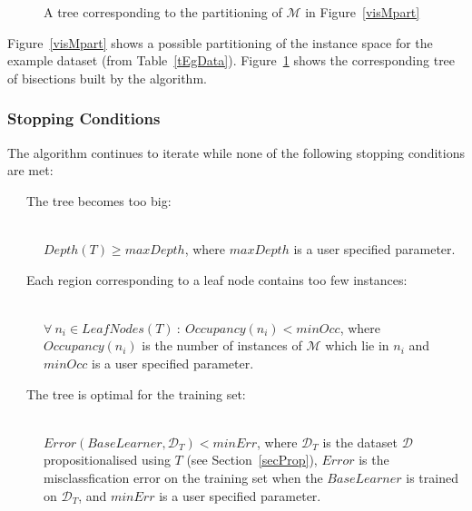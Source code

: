 \documentclass[a4paper,12pt]{article} %
\newcommand{\mcl}[1]{\mathcal{#1}}
\begin{document}
\begin{figure}
\begin{center}
\end{center}
\caption{A tree corresponding to the partitioning of $\mcl{M}$ in Figure~\ref{visMpart}}
\label{visMTree}
\end{figure}
    
Figure~\ref{visMpart} shows a possible partitioning of 
    the instance space for the example dataset (from Table~\ref{tEgData}).
Figure~\ref{visMTree} shows the corresponding tree of bisections built by
    the algorithm.

\subsubsection{Stopping Conditions}
\label{secStopCond}

The algorithm continues to iterate while none of the following stopping conditions are met:
\begin{description}

\item[~~~The tree becomes too big:] \ \\
    $Depth(T) \geq maxDepth$, 
    where  $maxDepth$ is a user specified parameter.
\item[~~~Each region corresponding to a leaf node contains too few instances:] \ \\ 
    $\forall~n_i \in LeafNodes(T) ~:~ Occupancy(n_i) < minOcc$, 
    where $Occupancy(n_i)$ is the number of instances of $\mcl{M}$ which lie in $n_i$ and
    $minOcc$ is a user specified parameter.
\item[~~~The tree is optimal for the training set:] \ \\
    $Error(BaseLearner, \mcl{D}_T) < minErr$, 
    where $\mcl{D}_T$ is the dataset $\mcl{D}$ propositionalised using $T$ (see Section~\ref{secProp}),
    $Error$ is the misclassfication error on the training set when 
    the $BaseLearner$ is trained on $\mcl{D}_T$,
    and $minErr$ is a user specified parameter.

\end{description}
\end{document}
